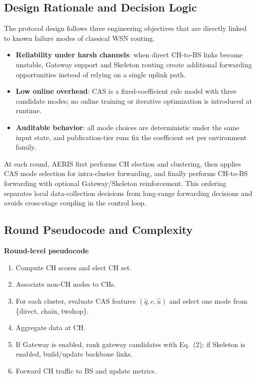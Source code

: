﻿\documentclass[sensors,article,submit,moreauthors,pdftex]{Definitions/mdpi}
\begin{document}
\subsection{Design Rationale and Decision Logic}
The protocol design follows three engineering objectives that are directly linked to known failure modes of classical WSN routing.
\begin{itemize}
\item \textbf{Reliability under harsh channels}: when direct CH-to-BS links become unstable, Gateway support and Skeleton routing create additional forwarding opportunities instead of relying on a single uplink path.
\item \textbf{Low online overhead}: CAS is a fixed-coefficient rule model with three candidate modes; no online training or iterative optimization is introduced at runtime.
\item \textbf{Auditable behavior}: all mode choices are deterministic under the same input state, and publication-tier runs fix the coefficient set per environment family.
\end{itemize}

At each round, AERIS first performs CH election and clustering, then applies CAS mode selection for intra-cluster forwarding, and finally performs CH-to-BS forwarding with optional Gateway/Skeleton reinforcement. This ordering separates local data-collection decisions from long-range forwarding decisions and avoids cross-stage coupling in the control loop.

\subsection{Round Pseudocode and Complexity}
\textbf{Round-level pseudocode}
\begin{enumerate}
\item Compute CH scores and elect CH set.
\item Associate non-CH nodes to CHs.
\item For each cluster, evaluate CAS features $(\hat{q},\hat{e},\hat{u})$ and select one mode from \{direct, chain, twohop\}.
\item Aggregate data at CH.
\item If Gateway is enabled, rank gateway candidates with Eq.~(2); if Skeleton is enabled, build/update backbone links.
\item Forward CH traffic to BS and update metrics.
\end{enumerate}
\end{document}
